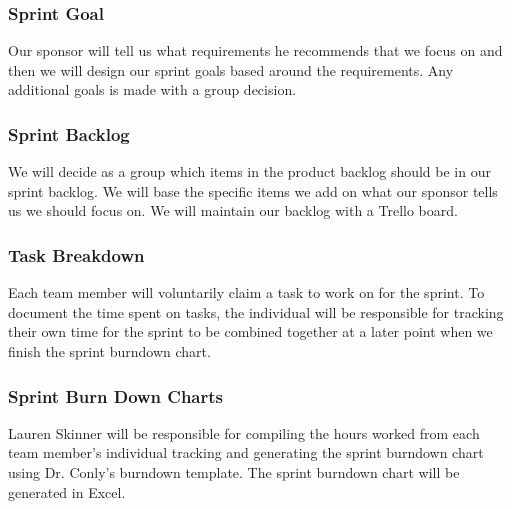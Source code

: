\subsubsection{Sprint Goal}
Our sponsor will tell us what requirements he recommends that we focus on and then we will design our sprint goals based around the requirements. Any additional goals is made with a group decision.

\subsubsection{Sprint Backlog}
We will decide as a group which items in the product backlog should be in our sprint backlog. We will base the specific items we add on what our sponsor tells us we should focus on. We will maintain our backlog with a Trello board.

\subsubsection{Task Breakdown}
Each team member will voluntarily claim a task to work on for the sprint. To document the time spent on tasks, the individual will be responsible for tracking their own time for the sprint to be combined together at a later point when we finish the sprint burndown chart.

\subsubsection{Sprint Burn Down Charts}
Lauren Skinner will be responsible for compiling the hours worked from each team member's individual tracking and generating the sprint burndown chart using Dr. Conly's burndown template. The sprint burndown chart will be generated in Excel.

